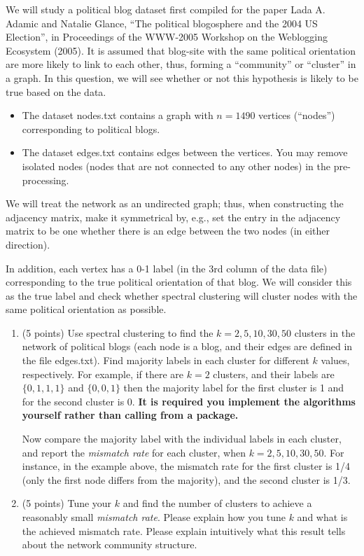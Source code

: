 \documentclass[twoside,10pt]{article}
\begin{document}
We will study a political blog dataset first compiled for the paper Lada A. Adamic and Natalie Glance, ``The political blogosphere and the 2004 US Election'', in Proceedings of the WWW-2005 Workshop on the Weblogging Ecosystem (2005). It is assumed that blog-site with the same political orientation are more likely to link to each other, thus, forming a ``community'' or ``cluster'' in a graph. In this question, we will see whether or not this hypothesis is likely to be true based on the data.
\begin{itemize}

\item The dataset \textsf{nodes.txt} contains a graph with $n = 1490$ vertices (``nodes'') corresponding to political blogs. 

\item The dataset \textsf{edges.txt} contains edges between the vertices. You may remove isolated nodes (nodes that are not connected to any other nodes) in the pre-processing. 

\end{itemize}

We will treat the network as an undirected graph; thus, when constructing the adjacency matrix, make it symmetrical by, e.g., set the entry in the adjacency matrix to be one whether there is an edge between the two nodes (in either direction). 

In addition, each vertex has a 0-1 label (in the 3rd column of the data file) corresponding to the true political orientation of that blog. We will consider this as the true label and check whether spectral clustering will cluster nodes with the same political orientation as possible. 

\begin{enumerate}

\item (5 points) Use spectral clustering to find the $k = 2, 5, 10, 30, 50$ clusters in the network of political blogs (each node is a blog, and their edges are defined in the file \textsf{edges.txt}). Find majority labels in each cluster for different $k$ values, respectively. For example, if there are $k = 2$ clusters, and their labels are $\{0, 1, 1, 1\}$ and $\{0, 0, 1\}$ then the majority label for the first cluster is 1 and for the second cluster is 0. {\bf It is required you implement the algorithms yourself rather than calling from a package.} 

Now compare the majority label with the individual labels in each cluster, and report the {\it mismatch rate} for each cluster, when $k = 2, 5, 10, 30, 50$. For instance, in the example above, the mismatch rate for the first cluster is 1/4 (only the first node differs from the majority), and the second cluster is 1/3. 

\item (5  points) Tune your $k$ and find the number of clusters to achieve a reasonably small {\it mismatch rate}. Please explain how you tune $k$ and what is the achieved mismatch rate. Please explain intuitively what this result tells about the network community structure.

\end{enumerate}
\end{document}
